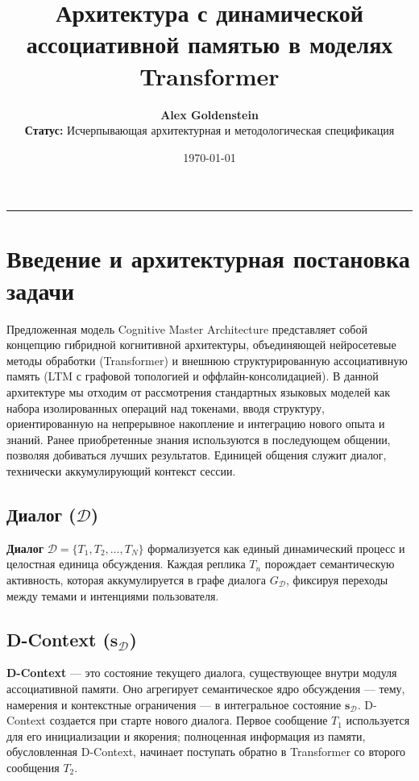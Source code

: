 \documentclass[11pt,a4paper]{article}
\title{\textbf{\Large \color{primarycolor} Архитектура с динамической ассоциативной памятью в моделях Transformer}}
\author{\Large \textbf{Alex Goldenstein} \\ \vspace{0.3cm} \normalsize \textbf{Статус:} Исчерпывающая архитектурная и методологическая спецификация}
\date{\today}
\begin{document}
\RaggedRight

\maketitle

\hrule
\vspace{0.5cm}

\section{Введение и архитектурная постановка задачи}

Предложенная модель Cognitive Master Architecture представляет собой концепцию гибридной когнитивной архитектуры, объединяющей нейросетевые методы обработки (Transformer) и внешнюю структурированную ассоциативную память (LTM с графовой топологией и оффлайн-консолидацией). В данной архитектуре мы отходим от рассмотрения стандартных языковых моделей как набора изолированных операций над токенами, вводя структуру, ориентированную на непрерывное накопление и интеграцию нового опыта и знаний. Ранее приобретенные знания используются в последующем общении, позволяя добиваться лучших результатов. Единицей общения служит диалог, технически аккумулирующий контекст сессии.

\subsection*{Диалог ($\mathcal{D}$)}
\textbf{Диалог} $\mathcal{D} = \{T_1, T_2, \dots, T_N\}$ формализуется как единый динамический процесс и целостная единица обсуждения. Каждая реплика $T_n$ порождает семантическую активность, которая аккумулируется в графе диалога $G_{\mathcal{D}}$, фиксируя переходы между темами и интенциями пользователя.

\subsection*{D-Context ($\mathbf{s}_{\mathcal{D}}$)}
\textbf{D-Context} — это состояние текущего диалога, существующее внутри модуля ассоциативной памяти. Оно агрегирует семантическое ядро обсуждения — тему, намерения и контекстные ограничения — в интегральное состояние $\mathbf{s}_{\mathcal{D}}$. D-Context создается при старте нового диалога. Первое сообщение $T_1$ используется для его инициализации и якорения; полноценная информация из памяти, обусловленная D-Context, начинает поступать обратно в Transformer со второго сообщения $T_2$.
\end{document}
